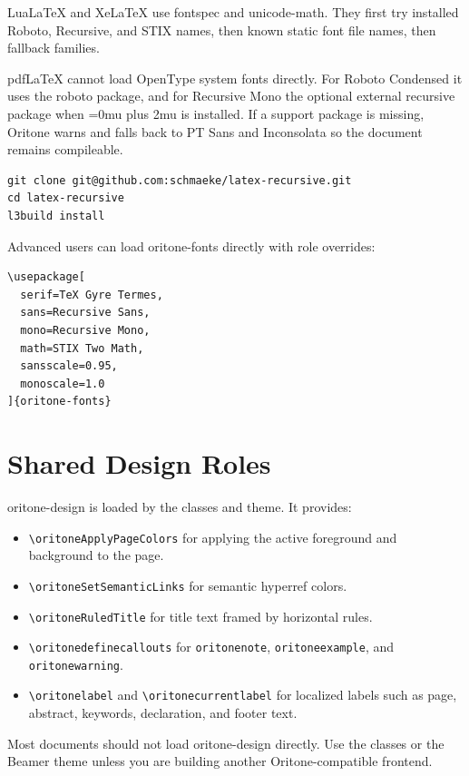 \documentclass[white,11pt,oneside]{oritone-manuscript}
\newcommand{\pkg}[1]{\textsf{#1}}
\newcommand{\cmd}[1]{\texttt{\textbackslash{}#1}}
\newcommand{\envname}[1]{\texttt{#1}}
\newcommand{\filename}[1]{\begingroup\Urlmuskip=0mu plus 2mu\path{#1}\endgroup}
\begin{document}
LuaLaTeX and XeLaTeX use \pkg{fontspec} and \pkg{unicode-math}. They first try
installed Roboto, Recursive, and STIX names, then known static font file names,
then fallback families.

pdfLaTeX cannot load OpenType system fonts directly. For Roboto Condensed it
uses the \pkg{roboto} package, and for Recursive Mono the optional external
\pkg{recursive} package when \filename{recursive.sty} is installed. If a support
package is missing, Oritone warns and falls back to PT Sans and Inconsolata so
the document remains compileable.

\begin{lstlisting}
git clone git@github.com:schmaeke/latex-recursive.git
cd latex-recursive
l3build install
\end{lstlisting}

Advanced users can load \pkg{oritone-fonts} directly with role overrides:

\begin{lstlisting}[language={[LaTeX]TeX}]
\usepackage[
  serif=TeX Gyre Termes,
  sans=Recursive Sans,
  mono=Recursive Mono,
  math=STIX Two Math,
  sansscale=0.95,
  monoscale=1.0
]{oritone-fonts}
\end{lstlisting}

\section{Shared Design Roles}

\pkg{oritone-design} is loaded by the classes and theme. It provides:

\begin{itemize}
  \item \cmd{oritoneApplyPageColors} for applying the active foreground and
    background to the page.
  \item \cmd{oritoneSetSemanticLinks} for semantic \pkg{hyperref} colors.
  \item \cmd{oritoneRuledTitle} for title text framed by horizontal rules.
  \item \cmd{oritonedefinecallouts} for \envname{oritonenote},
    \envname{oritoneexample}, and \envname{oritonewarning}.
  \item \cmd{oritonelabel} and \cmd{oritonecurrentlabel} for localized labels
    such as page, abstract, keywords, declaration, and footer text.
\end{itemize}

Most documents should not load \pkg{oritone-design} directly. Use the classes
or the Beamer theme unless you are building another Oritone-compatible frontend.
\end{document}
